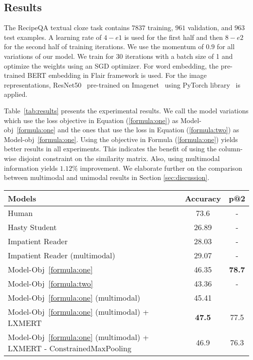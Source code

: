 \documentclass[11pt,a4paper]{article}
\begin{document}
\subsection{Results}
The RecipeQA textual cloze task contains $7837$ training, $961$ validation, and $963$ test examples. A learning rate of $4-e1$ is used for the first half and then $8-e2$ for the second half of training iterations. We use the momentum of $0.9$ for all variations of our model. We train for $30$ iterations with a batch size of 1 and optimize the weights using an SGD optimizer.
For word embedding, the pre-trained BERT embedding in Flair framework is used. For the image representations,  ResNet50~\cite{he2016deep} pre-trained on Imagenet~\cite{russakovsky2015imagenet} using PyTorch library~\cite{NEURIPS2019_9015} is applied.

Table~\ref{tab:results} presents the experimental results. We call the model variations which use the loss objective in Equation (\ref{formula:one}) as Model-obj~\ref{formula:one} and the ones that use the loss in Equation (\ref{formula:two}) as Model-obj~\ref{formula:one}. Using the objective in Formula (\ref{formula:one}) yields better results in all experiments. This indicates the benefit of using the column-wise disjoint constraint on the similarity matrix. Also, using multimodal information yields $1.12\%$ improvement. We elaborate further on the comparison between multimodal and unimodal results in Section \ref{sec:discussion}. 
\begin{table*}[h]
\centering
    \begin{tabular}{lcc}
        \hline
         Models & Accuracy & p@2\\ \hline
         Human & 73.6 & - \\
         Hasty Student &  26.89 & - \\
         Impatient Reader & 28.03 & - \\
         Impatient Reader (multimodal) & 29.07 & - \\ \hline
         Model-Obj~\ref{formula:one} & 46.35 & \textbf{78.7}\\
         Model-Obj~\ref{formula:two} & 43.36 & - \\
         Model-Obj~\ref{formula:one} (multimodal) & 45.41 \\
         Model-Obj~\ref{formula:one} (multimodal) + LXMERT& \textbf{47.5} & 77.5\\ 
         Model-Obj~\ref{formula:one} (multimodal) + LXMERT - ConstrainedMaxPooling& 46.9 & 76.3 \\
         \hline
    \end{tabular}
    \caption{Evaluation on the test set}
    \label{tab:results}
\end{table*}
\end{document}
